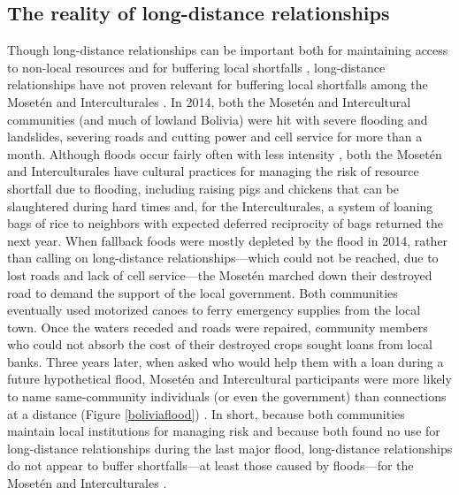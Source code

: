 \documentclass[bibauthoryear]{aa}
\begin{document}
	\subsection{The reality of long-distance relationships}\label{distance}
	Though long-distance relationships can be important both for maintaining access to non-local resources and for buffering local shortfalls \citep{pisor2019evolution}, long-distance relationships have not proven relevant for buffering local shortfalls among the Moset\'en and Interculturales \citep{pisorjones2020}. In 2014, both the Moset\'en and Intercultural communities (and much of lowland Bolivia) were hit with severe flooding and landslides, severing roads and cutting power and cell service for more than a month. Although floods occur fairly often with less intensity %
, both the Moset\'en and Interculturales have cultural practices for managing the risk of resource shortfall due to flooding, including raising pigs and chickens that can be slaughtered during hard times and, for the Interculturales, a system of loaning bags of rice to neighbors with expected deferred reciprocity of bags returned the next year. When fallback foods were mostly depleted by the flood in 2014, rather than calling on long-distance relationships---which could not be reached, due to lost roads and lack of cell service---the Moset\'en marched down their destroyed road to demand the support of the local government. Both communities eventually used motorized canoes to ferry emergency supplies from the local town. Once the waters receded and roads were repaired, community members who could not absorb the cost of their destroyed crops sought loans from local banks. Three years later, when asked who would help them with a loan during a future hypothetical flood, Moset\'en and Intercultural participants were more likely to name same-community individuals (or even the government) than connections at a distance (Figure \ref{boliviaflood}) \citep{pisorjones2020}. In short, because both communities maintain local institutions for managing risk and because both found no use for long-distance relationships during the last major flood, long-distance relationships do not appear to buffer shortfalls---at least those caused by floods---for the Moset\'en and Interculturales \citep{pisorjones2020}.
\end{document}
